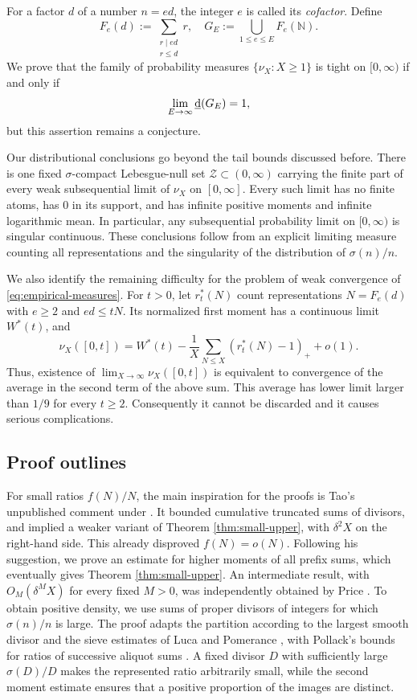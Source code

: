 \documentclass[11pt,letterpaper,reqno]{amsart}
\numberwithin{equation}{section}
\theoremstyle{remark}
\newcommand{\N}{\mathbb{N}}
\newcommand{\lowerdens}{\underline{\textup{d}}}
\renewcommand{\leq}{\leqslant}
\renewcommand{\geq}{\geqslant}
\begin{document}
For a factor $d$ of a number $n=ed$, the
integer $e$ is called its \emph{cofactor}. Define
\[
 F_e(d):=\sum_{\substack{r\mid ed\\r\leq d}}r,
 \quad G_E:=\bigcup_{1\leq e\leq E}F_e(\N).
\]
We prove that the family of probability measures $\{\nu_X:X\geq1\}$ is tight on $[0,\infty)$ if and
only if
\[
 \lim_{E\to\infty}\lowerdens(G_E)=1,
\]
but this assertion remains a conjecture.

Our distributional conclusions go beyond the tail bounds discussed before.
There is one fixed $\sigma$-compact Lebesgue-null set
$\mathcal{Z}\subset(0,\infty)$ carrying the finite part of every
weak subsequential limit of $\nu_X$ on $[0,\infty]$. Every such limit has no finite atoms,
has $0$ in its support, and has infinite positive moments and infinite
logarithmic mean. In particular, any subsequential probability limit on
$[0,\infty)$ is singular continuous. These conclusions follow from an
explicit limiting measure counting all representations and the
singularity of the distribution of $\sigma(n)/n$.

We also identify the remaining difficulty for the problem of weak convergence of \eqref{eq:empirical-measures}. For $t>0$,
let $r_t^*(N)$ count representations $N=F_e(d)$ with $e\geq2$ and
$ed\leq tN$. Its normalized first moment has a continuous limit
$W^*(t)$, and
\[
 \nu_X([0,t])=W^*(t)-\frac1X\sum_{N\leq X}(r_t^*(N)-1)_++o(1).
\]
Thus, existence of $\lim_{X\to\infty}\nu_X([0,t])$ is equivalent to convergence of the average in the second term of the above sum.
This average has lower limit larger than $1/9$ for every $t\geq2$. Consequently it cannot be discarded and it causes serious complications.

\subsection{Proof outlines}

For small ratios $f(N)/N$, the main inspiration for the proofs is Tao's unpublished comment under \cite{Bloom1054}. It bounded cumulative truncated sums of divisors, and implied a weaker variant of Theorem \ref{thm:small-upper}, with $\delta^2 X$ on the right-hand side. This already disproved $f(N)=o(N)$. Following his suggestion, we prove an estimate for higher moments of all prefix sums, which eventually gives Theorem \ref{thm:small-upper}.
An intermediate result, with $O_M(\delta^M X)$ for every fixed $M>0$, was independently obtained by Price \cite{Bloom1054}.
To obtain positive density, we use sums of proper divisors of integers for which
$\sigma(n)/n$ is large. The proof adapts the partition according to the
largest smooth divisor and the sieve estimates of Luca and Pomerance
\cite{LucaPomerance}, with Pollack's bounds for ratios of successive
aliquot sums \cite{Pollack}. A fixed divisor $D$ with sufficiently large
$\sigma(D)/D$ makes
the represented ratio arbitrarily small, while the second moment estimate
ensures that a positive proportion of the images are distinct.
\end{document}
